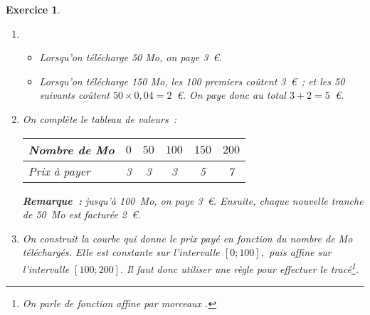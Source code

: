\documentclass[10pt]{article}
\newtheorem{exo}{Exercice}
\begin{document}
\begin{exo}


\begin{enumerate}
\item \begin{itemize}
\item[\textbullet] Lorsqu'on télécharge 50 Mo, on paye 3~\euro.
\item[\textbullet] Lorsqu'on télécharge 150 Mo, les 100 premiers coûtent 3~\euro~; et les 50 suivants coûtent $50\times 0,04=2$~\euro. On paye donc au total $3+2=5$~\euro.
\end{itemize}

\item On complète le tableau de valeurs~:



\smallskip

\begin{center}
\begin{tabular}{|l|c|c|c|c|c|}
\hline
   Nombre de Mo &$0$ &$50$ &$100$ &$150$ &$200$ \\
	\hline
	Prix à payer &3&3&3&5&7 \\
	\hline
\end{tabular}
\end{center}

\textbf{Remarque~:} jusqu'à 100~Mo, on paye 3~\euro. Ensuite, chaque nouvelle tranche de 50~Mo est facturée 2~\euro.

\item On construit la courbe qui donne le prix payé en fonction du nombre de Mo téléchargés. Elle est constante sur l'intervalle $\left[0;100\right],$ puis affine sur l'intervalle $\left[100;200\right].$ Il faut donc utiliser une règle pour effectuer le tracé\footnote{On parle de fonction \og affine par morceaux \fg.}.


\end{enumerate}
\end{exo}
\end{document}
